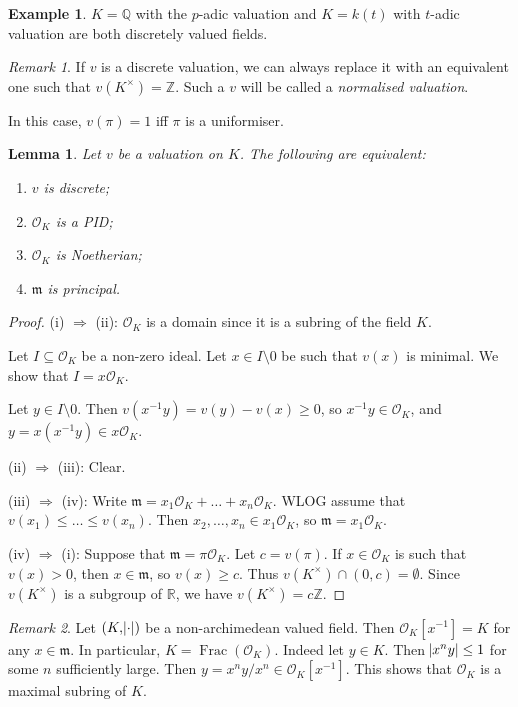 \documentclass[11pt]{article}
\theoremstyle{definition}
\newtheorem*{example}{Example}
\theoremstyle{plain}
\newtheorem{lemma}[definition]{Lemma}
\theoremstyle{remark}
\newtheorem*{remark}{Remark}
\DeclareMathOperator{\Frac}{Frac}
\newcommand{\ZZ}{\mathbb{Z}}
\newcommand{\QQ}{\mathbb{Q}}
\newcommand{\RR}{\mathbb{R}}
\newcommand{\cO}{\mathcal{O}}
\newcommand{\fm}{\mathfrak{m}}
\begin{document}
\begin{example}
    $K = \QQ$ with the $p$-adic valuation and $K = k(t)$ with $t$-adic valuation are both discretely valued fields.
\end{example}

\begin{remark}
    If $v$ is a discrete valuation, we can always replace it with an equivalent one such that $v(K^\times) = \ZZ$. Such a $v$ will be called a \emph{normalised valuation}.

    In this case, $v(\pi) = 1$ iff $\pi$ is a uniformiser.
\end{remark}

\begin{lemma}\label{lem:2_6}
    Let $v$ be a valuation on $K$. The following are equivalent:
    \begin{enumerate}
        \item $v$ is discrete;
        \item $\cO_K$ is a PID;
        \item $\cO_K$ is Noetherian;
        \item $\fm$ is principal.
    \end{enumerate}
\end{lemma}
\begin{proof}
    (i) $\Rightarrow$ (ii): $\cO_K$ is a domain since it is a subring of the field $K$.

    Let $I \subseteq \cO_K$ be a non-zero ideal. Let $x \in I \setminus 0$ be such that $v(x)$ is minimal. We show that $I = x \cO_K$.

    Let $y \in I \setminus 0$. Then $v(x^{-1} y) = v(y) - v(x) \ge 0$, so $x^{-1} y \in \cO_K$, and $y = x(x^{-1} y) \in x \cO_K$.

    \noindent (ii) $\Rightarrow$ (iii): Clear.

    \noindent (iii) $\Rightarrow$ (iv): Write $\fm = x_1 \cO_K + \ldots + x_n \cO_K$. WLOG assume that $v(x_1) \le \ldots \le v(x_n)$. Then $x_2, \ldots, x_n \in x_1 \cO_K$, so $\fm = x_1 \cO_K$.

    \noindent (iv) $\Rightarrow$ (i): Suppose that $\fm = \pi \cO_K$. Let $c = v(\pi)$. If $x \in \cO_K$ is such that $v(x) > 0$, then $x \in \fm$, so $v(x) \ge c$. Thus $v(K^\times) \cap (0, c) = \emptyset$. Since $v(K^\times)$ is a subgroup of $\RR$, we have $v(K^\times) = c \ZZ$.
\end{proof}

\begin{remark}
    Let $(K, \abs{\cdot})$ be a non-archimedean valued field. Then $\cO_K[x^{-1}] = K$ for any $x \in \fm$. In particular, $K = \Frac(\cO_K)$. Indeed let $y \in K$. Then $\abs{x^n y} \le 1$ for some $n$ sufficiently large. Then $y = x^n y / x^n \in \cO_K[x^{-1}]$. This shows that $\cO_K$ is a maximal subring of $K$.
\end{remark}
\end{document}
